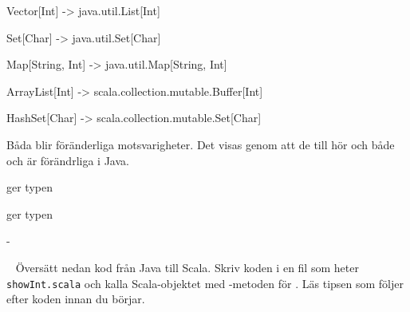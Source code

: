 \SOLUTION


\TaskSolved \what

\SubtaskSolved

Vector[Int] -> java.util.List[Int]

Set[Char] -> java.util.Set[Char]

Map[String, Int] -> java.util.Map[String, Int]

\SubtaskSolved

ArrayList[Int] -> scala.collection.mutable.Buffer[Int]

HashSet[Char] -> scala.collection.mutable.Set[Char]

Båda blir föränderliga motsvarigheter. Det visas genom att de till hör  och både  och  är förändrliga i Java.

\SubtaskSolved   {}

\SubtaskSolved   {} ger typen 

 ger typen 

\SubtaskSolved   -

\QUESTEND




\ExtraTasks %



\QUESTBEGIN

\Task  \what~ Översätt nedan kod från Java till Scala. Skriv koden i en fil som heter \texttt{showInt.scala} och kalla Scala-objektet med -metoden för . Läs tipsen som följer efter koden innan du börjar.


